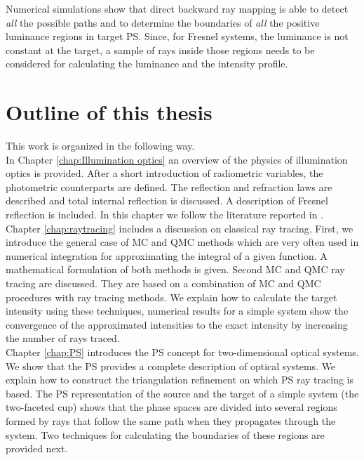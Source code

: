 Numerical simulations show that direct backward ray mapping is able to detect \textit{all} the possible paths and to determine the boundaries of \textit{all} the positive luminance regions in target PS. Since, for Fresnel systems, the luminance is not constant at the target, a sample of rays inside those regions needs to be considered for calculating the luminance and the intensity profile.
\section{Outline of this thesis}
This work is organized in the following way.\\ \indent
In Chapter \ref{chap:Illumination optics} an overview of the physics of illumination optics is provided. After a short introduction of radiometric variables, the photometric counterparts are defined. The reflection and refraction laws are described and total internal reflection is discussed. A description of Fresnel reflection is included. In this chapter we follow the literature reported in \cite{hecht1998hecht, feynman2011feynman, feynman1964feynman}.\\ \indent
Chapter \ref{chap:raytracing} includes a discussion on classical ray tracing. First, we introduce the general case of MC and QMC methods which are very often used in numerical integration for approximating the integral of a given function. A mathematical formulation of both methods is given. Second MC and QMC ray tracing are discussed. They are based on a combination of MC and QMC procedures with ray tracing methods. We explain how to calculate the target intensity using these techniques, numerical results for a simple system show the convergence of the approximated intensities to the exact intensity by increasing the number of rays traced.\\\indent
Chapter \ref{chap:PS} introduces the PS concept for two-dimensional optical systems. We show that the PS provides a complete description of optical systems. We explain how to construct the triangulation refinement on which PS ray tracing is based. The PS representation of the source and the target of a simple system (the two-faceted cup) shows that the phase spaces are divided into several regions formed by rays that follow the same path when they propagates through the system. Two techniques for calculating the boundaries of these regions are provided next. \\ \indent 

